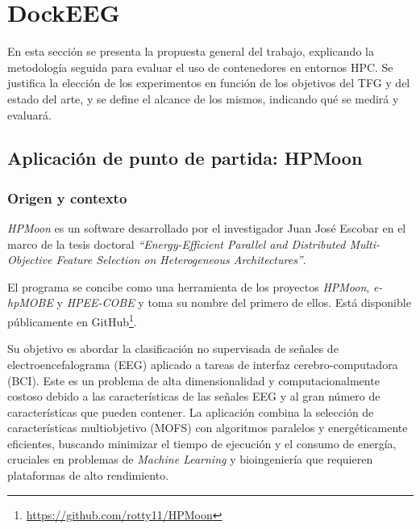 \chapter{DockEEG}\label{cap:DockEEG}


En esta sección se presenta la propuesta general del trabajo, explicando la metodología seguida para evaluar el uso de contenedores en entornos HPC. Se justifica la elección de los experimentos en función de los objetivos del TFG y del estado del arte, y se define el alcance de los mismos, indicando qué se medirá y evaluará.

\section{Aplicación de punto de partida: HPMoon}\label{sec:hpm_application}

\subsection{Origen y contexto}\label{subsec:hpm_origen}

\textit{HPMoon} es un software desarrollado por el investigador Juan José Escobar en el marco de la tesis doctoral \textit{``Energy-Efficient Parallel and Distributed Multi-Objective Feature Selection on Heterogeneous Architectures''}.

El programa se concibe como una herramienta de los proyectos \textit{\textit{HPMoon}}, \textit{e-hpMOBE} y \textit{HPEE-COBE} y toma su nombre del primero de ellos. Está disponible públicamente en GitHub\footnote{\url{https://github.com/rotty11/HPMoon}}.

Su objetivo es abordar la clasificación no supervisada de señales de electroencefalograma (\acs{EEG}) aplicado a tareas de interfaz cerebro-computadora (\acs{BCI}). Este es un problema de alta dimensionalidad y computacionalmente costoso debido a las características de las señales \acs{EEG} y al gran número de características que pueden contener. La aplicación combina la selección de características multiobjetivo (\acs{MOFS}) con algoritmos paralelos y energéticamente eficientes, buscando minimizar el tiempo de ejecución y el consumo de energía, cruciales en problemas de \textit{Machine Learning} y bioingeniería que requieren plataformas de alto rendimiento.

